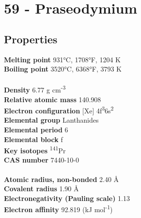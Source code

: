 \section{59 - Praseodymium}
\label{sec:elem-praseodymium}
\subsection{Properties}
\textbf{Melting point} 931°C, 1708°F, 1204 K\\
\textbf{Boiling point} 3520°C, 6368°F, 3793 K\\
\\
\textbf{Density} 6.77 g cm\textsuperscript{-3}\\
\textbf{Relative atomic mass} 140.908\\
\textbf{Electron configuration} [Xe] 4f\textsuperscript{3}6s\textsuperscript{2}\\
\textbf{Elemental group} Lanthanides\\
\textbf{Elemental period} 6\\
\textbf{Elemental block} f\\
\textbf{Key isotopes} \textsuperscript{141}Pr\\
\textbf{CAS number} 7440-10-0\\
\\
\textbf{Atomic radius, non-bonded} 2.40 Å\\
\textbf{Covalent radius} 1.90 Å\\
\textbf{Electronegativity (Pauling scale)} 1.13\\
\textbf{Electron affinity} 92.819 (kJ mol\textsuperscript{-1})\\